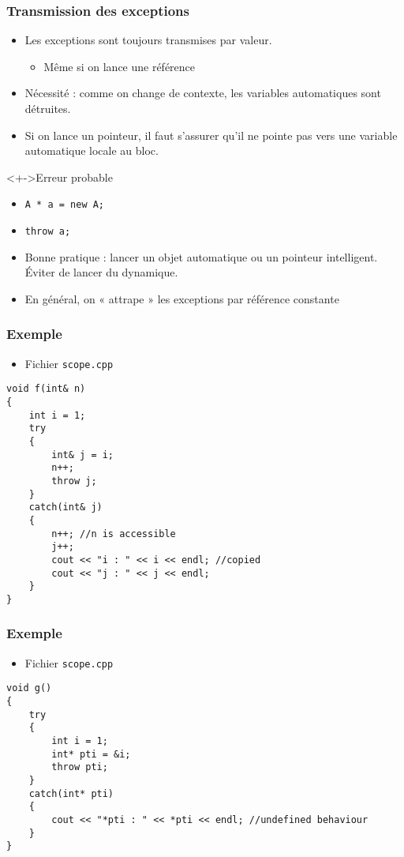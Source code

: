 \begin{frame}
\frametitle{Transmission des exceptions}
\begin{itemize}[<+->]
\item Les exceptions sont toujours transmises par valeur.
	\begin{itemize}
	\item Même si on lance une référence
	\end{itemize}
\item Nécessité : comme on change de contexte, les variables automatiques sont détruites.
\item Si on lance un pointeur, il faut s'assurer qu'il ne pointe pas vers une variable automatique locale au bloc.
\end{itemize}
\begin{exampleblock}<+->{Erreur probable}
	\begin{itemize}[<+->]
	\item \lstinline|A * a = new A;|
	\item \lstinline|throw a;|
	\end{itemize}
\end{exampleblock}
\begin{itemize}[<+->]
\item Bonne pratique : lancer un objet automatique ou un pointeur intelligent. Éviter de lancer du dynamique.
\item En général, on « attrape » les exceptions par référence constante
\end{itemize}
\end{frame}

\begin{frame}[containsverbatim]
\frametitle{Exemple}
\begin{itemize}
\item Fichier \texttt{scope.cpp}
\end{itemize}
\begin{lstlisting}
void f(int& n)
{
	int i = 1;
	try
	{		
		int& j = i;
		n++;
		throw j;
	}
	catch(int& j)
	{
		n++; //n is accessible
		j++;
		cout << "i : " << i << endl; //copied
		cout << "j : " << j << endl;
	}
}
\end{lstlisting}
\end{frame}

\begin{frame}[containsverbatim]
\frametitle{Exemple}
\begin{itemize}
\item Fichier \texttt{scope.cpp}
\end{itemize}
\begin{lstlisting}
void g()
{
	try
	{
		int i = 1;
		int* pti = &i;
		throw pti;
	}
	catch(int* pti)
	{
		cout << "*pti : " << *pti << endl; //undefined behaviour
	}
}
\end{lstlisting}
\end{frame}

